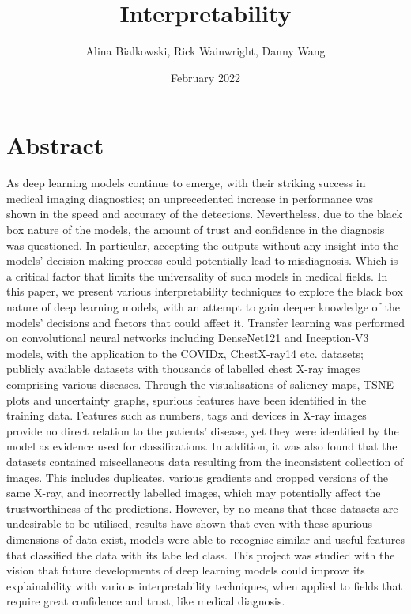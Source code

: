 \documentclass{article}
\title{Interpretability}
\author{
Alina Bialkowski, Rick Wainwright, Danny Wang}
\date{February 2022}
\begin{document}
\maketitle

\section{Abstract}
As deep learning models continue to emerge, with their striking success in medical imaging diagnostics; 
an unprecedented increase in performance was shown in the speed and accuracy of the detections. Nevertheless, 
due to the black box nature of the models, the amount of trust and confidence in the diagnosis was questioned. 
In particular, accepting the outputs without any insight into the models' decision-making process could potentially 
lead to misdiagnosis. Which is a critical factor that limits the universality of such models in medical fields. In 
this paper, we present various interpretability techniques to explore the black box nature of deep learning models, 
with an attempt to gain deeper knowledge of the models' decisions and factors that could affect it. Transfer learning 
was performed on convolutional neural networks including DenseNet121 and Inception-V3 models, with the application to 
the COVIDx, ChestX-ray14 etc. datasets; publicly available datasets with thousands of labelled chest X-ray images 
comprising various diseases. Through the visualisations of saliency maps, TSNE plots and uncertainty graphs, spurious 
features have been identified in the training data. Features such as numbers, tags and devices in X-ray images provide 
no direct relation to the patients' disease, yet they were identified by the model as evidence used for classifications. 
In addition, it was also found that the datasets contained miscellaneous data resulting from the inconsistent collection 
of images. This includes duplicates, various gradients and cropped versions of the same X-ray, and incorrectly labelled 
images, which may potentially affect the trustworthiness of the predictions. However, by no means that these datasets are 
undesirable to be utilised, results have shown that even with these spurious dimensions of data exist, models were able 
to recognise similar and useful features that classified the data with its labelled class. This project was studied with 
the vision that future developments of deep learning models could improve its explainability with various interpretability 
techniques, when applied to fields that require great confidence and trust, like medical diagnosis.
\end{document}
